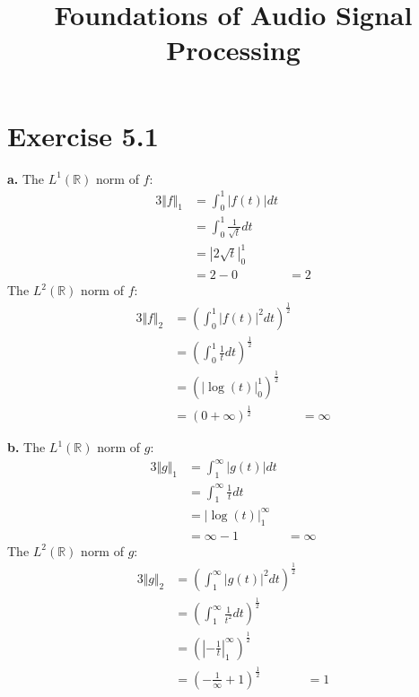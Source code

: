 \documentclass[12pt]{article}
\title{Foundations of Audio Signal Processing\\ \ass}
\author{\auth}
\newcommand{\real}{\mathbb{R}}
\newcommand{\liup}{\ensuremath{1}}
\newcommand{\lido}{\ensuremath{0}}
\newcommand{\liiup}{\ensuremath{\infty}}
\newcommand{\liido}{\ensuremath{1}}
\begin{document}
	\maketitle
	\section*{Exercise 5.1}
	\textbf{a.} The $L^1(\real)$ norm of $f$:
	\begin{alignat*}{3}
	\Vert f \Vert_1 &= \int_{\lido}^{\liup} \vert f(t) \vert dt\\
	&= \int_{\lido}^{\liup} \frac{1}{\sqrt{t}} dt\\
	&= \left| 2\sqrt{t} \right|^{\liup}_{\lido}\\
	&= 2 - 0 &= 2
	\end{alignat*}
	The $L^2(\real)$ norm of $f$:
	\begin{alignat*}{3}
	\Vert f \Vert_2 &= \left(\int_{\lido}^{\liup} \vert f(t) \vert^2 dt\right)^\frac{1}{2}\\
	&= \left(\int_{\lido}^{\liup} \frac{1}{t} dt\right)^\frac{1}{2}\\
	&= \left(\left| \log(t) \right|^\liup_{\lido}\right)^\frac{1}{2}\\
	&= \left(0 + \infty \right)^\frac{1}{2} &= \infty
	\end{alignat*}
	
	
	\textbf{b.} The $L^1(\real)$ norm of $g$:
	\begin{alignat*}{3}
	\Vert g \Vert_1 &= \int_{\liido}^{\liiup} \vert g(t) \vert dt\\
	&= \int_{\liido}^{\liiup} \frac{1}{t} dt\\
	&= \left| \log(t) \right|^\liiup_{\liido} \\
	&= \infty  - 1 &= \infty
	\end{alignat*}
	The $L^2(\real)$ norm of $g$:
	\begin{alignat*}{3}
	\Vert g \Vert_2 &= \left(\int_{\liido}^{\liiup} \vert g(t) \vert^2 dt\right)^\frac{1}{2}\\
	&= \left(\int_{\liido}^{\liiup} \frac{1}{t^2} dt\right)^\frac{1}{2}\\
	&= \left(\left| -\frac{1}{t} \right|^\infty_{\liido}\right)^\frac{1}{2}\\
	&= \left(-\frac{1}{\infty} + 1\right)^\frac{1}{2} &= 1
	\end{alignat*}
	
	
	
\end{document}
